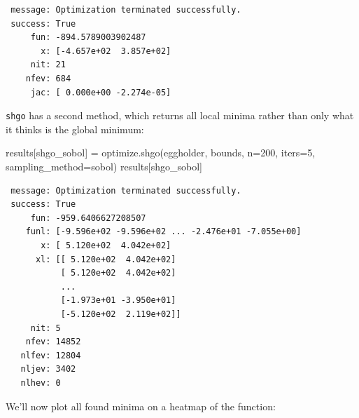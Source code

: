 \documentclass[
  letterpaper,
  DIV=11,
  numbers=noendperiod]{scrreprt}
\newenvironment{Shaded}{\begin{snugshade}}{\end{snugshade}}
\newcommand{\DecValTok}[1]{\textcolor[rgb]{0.68,0.00,0.00}{#1}}
\newcommand{\NormalTok}[1]{\textcolor[rgb]{0.00,0.23,0.31}{#1}}
\newcommand{\OperatorTok}[1]{\textcolor[rgb]{0.37,0.37,0.37}{#1}}
\newcommand{\StringTok}[1]{\textcolor[rgb]{0.13,0.47,0.30}{#1}}
\begin{document}
\begin{verbatim}
 message: Optimization terminated successfully.
 success: True
     fun: -894.5789003902487
       x: [-4.657e+02  3.857e+02]
     nit: 21
    nfev: 684
     jac: [ 0.000e+00 -2.274e-05]
\end{verbatim}

\texttt{shgo} has a second method, which returns all local minima rather
than only what it thinks is the global minimum:

\begin{Shaded}
\begin{Highlighting}[]
\NormalTok{results[}\StringTok{\textquotesingle{}shgo\_sobol\textquotesingle{}}\NormalTok{] }\OperatorTok{=}\NormalTok{ optimize.shgo(eggholder, bounds, n}\OperatorTok{=}\DecValTok{200}\NormalTok{, iters}\OperatorTok{=}\DecValTok{5}\NormalTok{,}
\NormalTok{                                      sampling\_method}\OperatorTok{=}\StringTok{\textquotesingle{}sobol\textquotesingle{}}\NormalTok{)}
\NormalTok{results[}\StringTok{\textquotesingle{}shgo\_sobol\textquotesingle{}}\NormalTok{]}
\end{Highlighting}
\end{Shaded}

\begin{verbatim}
 message: Optimization terminated successfully.
 success: True
     fun: -959.6406627208507
    funl: [-9.596e+02 -9.596e+02 ... -2.476e+01 -7.055e+00]
       x: [ 5.120e+02  4.042e+02]
      xl: [[ 5.120e+02  4.042e+02]
           [ 5.120e+02  4.042e+02]
           ...
           [-1.973e+01 -3.950e+01]
           [-5.120e+02  2.119e+02]]
     nit: 5
    nfev: 14852
   nlfev: 12804
   nljev: 3402
   nlhev: 0
\end{verbatim}

We'll now plot all found minima on a heatmap of the function:
\end{document}

